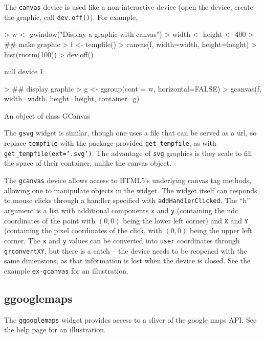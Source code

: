 \documentclass[12pt]{article}
\newcommand{\code}[1]{\texttt{#1}}
\begin{document}
The \code{canvas} device is used like a non-interactive device (open
the device, create the graphic, call \code{dev.off()}). For example,
\begin{Schunk}
\begin{Sinput}
> w <- gwindow("Display a graphic with canvas")
> width <- height <- 400
> ## make graphic
> f <- tempfile()
> canvas(f, width=width, height=height)
> hist(rnorm(100))
> dev.off()
\end{Sinput}
\begin{Soutput}
null device 
          1 
\end{Soutput}
\begin{Sinput}
> ## display graphic
> g <- ggroup(cont = w, horizontal=FALSE)
> gcanvas(f, width=width, height=height, container=g)
\end{Sinput}
\begin{Soutput}
An object of class GCanvas 
\end{Soutput}
\end{Schunk}
The \code{gsvg} widget is similar, though one uses a file that can be
served as a url, so replace \code{tempfile} with the package-provided
\code{get\_tempfile}, as with \code{get\_tempfile(ext='.svg')}. The
advantage of \code{svg} graphics is they scale to fill the space of
their container, unlike the canvas object.


The \code{gcanvas} device allows access to HTML5's underlying canvas
tag methods, allowing one to manipulate objects in the widget.  The
widget itself can responds to mouse clicks through a handler specified
with \code{addHandlerClicked}. The ``h'' argument is a list with
additional components \code{x} and \code{y} (containing the ndc
coordinates of the point with $(0,0)$ being the lower left corner) and
\code{X} and \code{Y} (containing the pixel coordinates of the click,
with $(0,0)$ being the upper left corner. The \code{x} and \code{y}
values can be converted into \code{user} coordinates through
\code{grconvertXY}, but there is a catch -- the device needs to be
reopened with the same dimensions, as that information is lost when
the device is closed. See the example \code{ex-gcanvas} for an
illustration.


\subsection{ggooglemaps}
\label{sec:ggooglemaps}

The \code{ggooglemaps} widget provides access to a sliver of the
google maps API. See the help page for an illustration.
\end{document}
